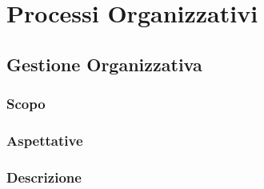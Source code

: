 \section{Processi Organizzativi}
\subsection{Gestione Organizzativa}
\subsubsection{Scopo}
\subsubsection{Aspettative}
\subsubsection{Descrizione}

